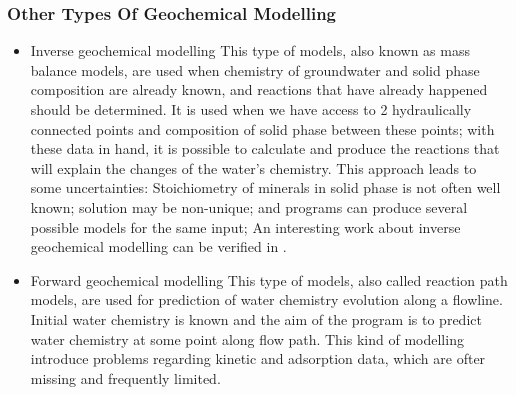 \documentclass[ppgc,mestrado,english]{iiufrgs}
\begin{document}
\subsubsection{Other Types Of Geochemical Modelling}
\begin{itemize}
\item Inverse geochemical modelling
This type of models, also known as mass balance models, are used when chemistry of groundwater and solid phase composition are already known, and reactions that have already happened should be determined. It is used when we have access to 2 hydraulically connected points and composition of solid phase between these points; with these data in hand, it is possible to calculate and produce the reactions that will explain the changes of the water's chemistry. This approach leads to some uncertainties: Stoichiometry of minerals in solid phase is not often well known; solution may be non-unique; and programs can produce several possible models for the same input;
An interesting work about inverse geochemical modelling can be verified in \cite{Sharif:07}.
\item Forward geochemical modelling
This type of models, also called reaction path models, are used for prediction of water chemistry evolution along a flowline. Initial water chemistry is known and the aim of the program is to predict water chemistry at some point along flow path. This kind of modelling introduce problems regarding kinetic and adsorption data, which are ofter missing and frequently limited. 
\end{itemize}

\newpage

\end{document}
